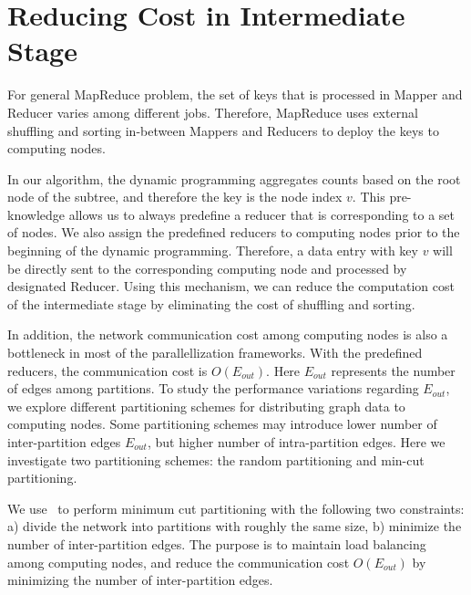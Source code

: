 \section{Reducing Cost in Intermediate Stage}
\label{sec:enhanced-sahad}

For general MapReduce problem, the set of keys that is processed in Mapper and
Reducer varies among different jobs. Therefore, MapReduce uses external
shuffling and sorting
in-between Mappers and Reducers to deploy the keys to computing nodes. 

In our algorithm, the dynamic programming aggregates counts based on the root
node of the subtree, and therefore the key is the node index $v$. This
pre-knowledge allows us to always predefine a reducer that is corresponding to a
set of nodes. We also assign the predefined reducers to computing nodes prior to the
beginning of the dynamic programming. Therefore, a data entry with key $v$ will be
directly sent to the corresponding computing node and processed by designated
Reducer. Using this mechanism, we can reduce the computation cost of the
intermediate stage by eliminating the cost of shuffling and sorting.

In addition, the network communication cost among computing nodes is also a
bottleneck in most of the parallellization frameworks. With the predefined
reducers, the communication cost is $O(E_{out})$. Here $E_{out}$ represents the
number of edges among partitions. To study the performance variations regarding
$E_{out}$, we explore different partitioning schemes for distributing graph data
to computing nodes.  Some partitioning schemes may introduce lower number of
inter-partition edges $E_{out}$, but higher number of intra-partition edges.
Here we investigate two partitioning schemes: the random partitioning and
min-cut partitioning.

We use~\cite{Web:metis} to perform minimum cut partitioning with the following
two constraints: a) divide the network into partitions with roughly the same
size, b) minimize the number of inter-partition edges. The purpose is to
maintain load balancing among computing nodes, and reduce the communication cost
$O(E_{out})$ by minimizing the number of inter-partition edges.


